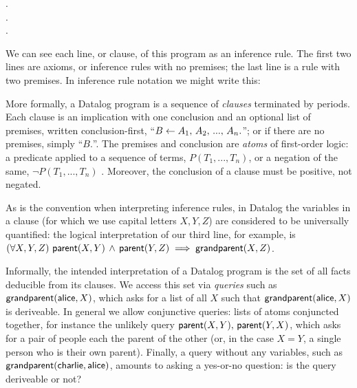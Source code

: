 \nopagebreak[2]
\begin{datalog}
  .
  \\
  .
  \\
   \gets {} \conj {}.
\end{datalog}

\noindent
We can see each line, or clause, of this program as an inference rule. The first
two lines are axioms, or inference rules with no premises; the last line is a
rule with two premises. In inference rule notation we might write this:
%
\begin{mathpar}


\end{mathpar}

\noindent
More formally, a Datalog program is a sequence of \emph{clauses} terminated by
periods. Each clause is an implication with one conclusion and an optional list
of premises, written conclusion-first, ``$B \gets A_1 \conj A_2 \conj ... \conj
A_n.$''; or if there are no premises, simply ``$B.$''. The premises and
conclusion are \emph{atoms} of first-order logic: a predicate applied to a
sequence of terms, $P(T_1, ..., T_n)$, or a negation of the same, $\neg P(T_1,
..., T_n)$%
.
%
%
Moreover, the conclusion of a clause must be positive, not negated.
%

As is the convention when interpreting inference rules, in Datalog the variables
in a clause (for which we use capital letters $X,Y,Z$) are considered to be
universally quantified: the logical interpretation of our third line, for
example, is $\fa{X, Y, Z} \atom{parent}{X, Y} \wedge \atom{parent}{Y, Z}
\implies \atom{grandparent}{X, Z}$.

Informally, the intended interpretation of a Datalog program is the set of all
facts deducible from its clauses.
%
We access this set via \emph{queries} such as
$\atom{grandparent}{\datum{alice},X}$, which asks for a list of all $X$ such
that $\atom{grandparent}{\datum{alice},X}$ is deriveable. In general we allow
conjunctive queries: lists of atoms conjuncted together, for instance the
unlikely query $\atom{parent}{X,Y} \conj \atom{parent}{Y,X}$, which asks for a
pair of people each the parent of the other (or, in the case $X = Y$, a single
person who is their own parent). Finally, a query without any variables, such as
$\atom{grandparent}{\datum{charlie}, \datum{alice}}$, amounts to asking a
yes-or-no question: is the query deriveable or not?

